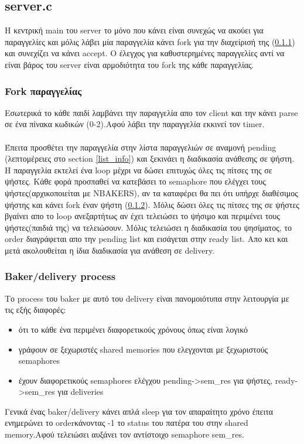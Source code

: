 \documentclass{article}
\begin{document}
\subsection{server.c}
Η κεντρική main του server το μόνο που κάνει είναι συνεχώς να ακούει για παραγγελίες και μόλις λάβει μία παραγγελία κάνει fork για την διαχείρισή της (\ref{order}) και συνεχίζει να κάνει accept. Ο έλεγχος για καθυστερημένες παραγγελίες αντί να είναι βάρος του server είναι αρμοδιότητα του fork της κάθε παραγγελίας.

\subsubsection{Fork παραγγελίας}
\label{order}
Εσωτερικά το κάθε παιδί λαμβάνει την παραγγελία απο τον client και την κάνει parse σε ένα πίνακα κωδικών (0-2).Αφού λάβει την παραγγελία εκκινεί τον timer.
\paragraph{}
Έπειτα προσθέτει την παραγγελία στην λίστα παραγγελιών σε αναμονή pending (λεπτομέρειες στο section \ref{list_info}) και ξεκινάει η διαδικασία ανάθεσης σε ψήστη. H παραγγελία εκτελεί ένα loop μέχρι να δώσει επιτυχώς όλες τις πίτσες της σε ψήστες. Κάθε φορά προσπαθεί να κατεβάσει το semaphore που ελέγχει τους ψήστες(αρχικοποιείται με NBAKERS), αν τα καταφέρει θα πει ότι υπήρχε διαθέσιμος ψήστης και κάνει fork έναν ψήστη (\ref{baker}). Μόλις δώσει όλες τις πίτσες της σε ψήστες βγαίνει απο το loop ανεξαρτήτως αν έχει τελειώσει το ψήσιμο και περιμένει τους ψήστες(παιδιά της) να τελειώσουν. Μόλις τελειώσει η διαδικασία του ψησίματος, το order διαγράφεται απο την pending list και εισάγεται στην ready list. Απο κει και μετά 
ακολουθείται η ίδια διαδικασία για ανάθεση σε delivery.

\subsubsection{Baker/delivery process}
\label{baker}
Το process του baker με αυτό του delivery είναι πανομοιότυπα στην λειτουργία με τις εξής διαφορές:
\begin{itemize}
 \item ότι το κάθε ένα περιμένει διαφορετικούς χρόνους όπως είναι λογικό
 \item γράφουν σε ξεχωριστές shared memories που ελεγχονται με ξεχωριστούς semaphores
 \item έχουν διαφορετικούς semaphores ελέγχου pending->sem\_res για ψήστες, ready->sem\_res για deliveries
\end{itemize}
Γενικά ένας baker/delivery κάνει απλά sleep για τον απαραίτητο χρόνο έπειτα ενημερώνει το orderκάνοντας -1 το status του πατέρα του στην shared memory.Αφού τελειώσει αυξάνει τον αντίστοιχο semaphore sem\_res.
\end{document}

